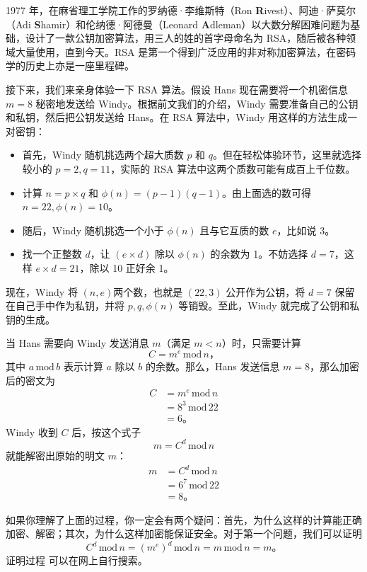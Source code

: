 1977 年，在麻省理工学院工作的罗纳德·李维斯特（Ron \textbf{R}ivest）、阿迪·萨莫尔（Adi \textbf{S}hamir）和伦纳德·阿德曼（Leonard \textbf{A}dleman）以大数分解困难问题为基础，设计了一款公钥加密算法，用三人的姓的首字母命名为 RSA，随后被各种领域大量使用，直到今天。RSA 是第一个得到广泛应用的非对称加密算法，在密码学的历史上亦是一座里程碑。

接下来，我们来亲身体验一下 RSA 算法。假设 Hans 现在需要将一个机密信息 $m=8$ 秘密地发送给 Windy。根据前文我们的介绍，Windy 需要准备自己的公钥和私钥，然后把公钥发送给 Hans。在 RSA 算法中，Windy 用这样的方法生成一对密钥：

\begin{itemize}
  \item 首先，Windy 随机挑选两个超大质数 $p$ 和 $q$。但在轻松体验环节，这里就选择较小的 $p=2,q=11$，实际的 RSA 算法中这两个质数可能有成百上千位数。
  \item 计算 $n=p\times q$ 和 $\phi(n)=(p-1)(q-1)$。由上面选的数可得 $n=22,\phi(n)=10$。
  \item 随后，Windy 随机挑选一个小于 $\phi(n)$ 且与它互质的数 $e$，比如说 3。
  \item 找一个正整数 $d$，让 $(e \times d)$ 除以 $\phi(n)$ 的余数为 1。不妨选择 $d=7$，这样 $e \times d = 21$，除以 10 正好余 1。
\end{itemize}

现在，Windy 将 $(n, e)$两个数，也就是 $(22, 3)$ 公开作为公钥，将 $d=7$ 保留在自己手中作为私钥，并将 $p, q, \phi(n)$ 等销毁。至此，Windy 就完成了公钥和私钥的生成。

当 Hans 需要向 Windy 发送消息 $m$（满足 $m<n$）时，只需要计算
\[C= m^e\,\mathrm{mod}\,n\text{，}\]
其中 $a\,\mathrm{mod}\,b$ 表示计算 $a$ 除以 $b$ 的余数。那么，Hans 发送信息 $m=8$，那么加密后的密文为
\begin{align*}
  C &= m^e\,\mathrm{mod}\,n \\
  &= 8^3\,\mathrm{mod}\,22 \\
  &= 6\text{。}
\end{align*}
Windy 收到 $C$ 后，按这个式子
\[m= C^d\,\mathrm{mod}\,n\]
就能解密出原始的明文 $m$：
\begin{align*}
  m &= C^d\,\mathrm{mod}\,n \\
  &= 6^7\,\mathrm{mod}\,22 \\
  &= 8\text{。}
\end{align*}

如果你理解了上面的过程，你一定会有两个疑问：首先，为什么这样的计算能正确加密、解密；其次，为什么这样加密能保证安全。对于第一个问题，我们可以证明
\[C^d\,\mathrm{mod}\,n=(m^e)^d\,\mathrm{mod}\,n=m\,\mathrm{mod}\,n=m\text{。}\]
证明过程  可以在网上自行搜索。

